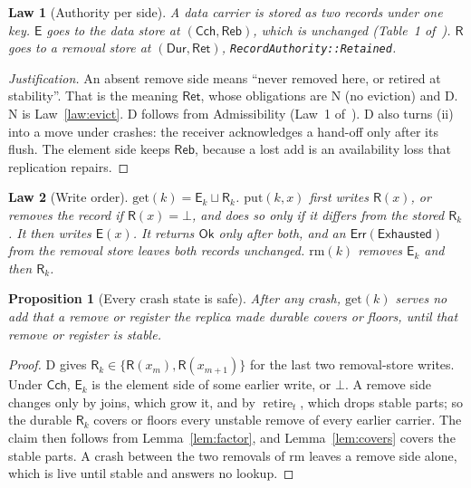 \documentclass[journal]{IEEEtran}
\newtheorem{law}{Law}
\newtheorem{proposition}{Proposition}
\newcommand{\Cached}{\mathsf{Cch}}
\newcommand{\Durable}{\mathsf{Dur}}
\newcommand{\Rebuild}{\mathsf{Reb}}
\newcommand{\Retained}{\mathsf{Ret}}
\newcommand{\Ok}{\mathsf{Ok}}
\newcommand{\Err}{\mathsf{Err}}
\newcommand{\Exhausted}{\mathsf{Exhausted}}
\newcommand{\El}{\mathsf{E}}
\newcommand{\Rm}{\mathsf{R}}
\newcommand{\ret}{\operatorname{retire}}
\begin{document}
\begin{law}[Authority per side]\label{law:authority}
A data carrier is stored as two records under one key.  $\El$ goes to the data store at
$(\Cached,\Rebuild)$, which is unchanged (Table~1 of~\cite{DurableRecords}).  $\Rm$ goes to a
\emph{removal store} at $(\Durable,\Retained)$, \texttt{RecordAuthority::Retained}.
\end{law}

\begin{proof}[Justification]
An absent remove side means ``never removed here, or retired at stability''.  That is the
meaning $\Retained$, whose obligations are N (no eviction) and D.  N is
Law~\ref{law:evict}.  D follows from Admissibility (Law~1 of~\cite{DurableRecords}).  D also
turns (ii) into a move under crashes: the receiver acknowledges a hand-off only after its
flush.  The element side keeps $\Rebuild$, because a lost add is an availability loss that
replication repairs.
\end{proof}

\begin{law}[Write order]\label{law:order}
$\mathrm{get}(k)=\El_k\sqcup\Rm_k$.  $\mathrm{put}(k,x)$ first writes $\Rm(x)$, or removes
the record if $\Rm(x)=\bot$, and does so only if it differs from the stored $\Rm_k$.  It then
writes $\El(x)$.  It returns $\Ok$ only after both, and an $\Err(\Exhausted)$ from the
removal store leaves both records unchanged.  $\mathrm{rm}(k)$ removes $\El_k$ and then
$\Rm_k$.
\end{law}

\begin{proposition}[Every crash state is safe]\label{prop:crash}
After any crash, $\mathrm{get}(k)$ serves no add that a remove or register the replica made
durable covers or floors, until that remove or register is stable.
\end{proposition}
\begin{proof}
D gives $\Rm_k\in\{\Rm(x_m),\Rm(x_{m+1})\}$ for the last two removal-store writes.  Under
$\Cached$, $\El_k$ is the element side of some earlier write, or $\bot$.  A remove side
changes only by joins, which grow it, and by $\ret_t$, which drops stable parts; so the
durable $\Rm_k$ covers or floors every unstable remove of every earlier carrier.  The claim
then follows from Lemma~\ref{lem:factor}, and Lemma~\ref{lem:covers} covers the stable parts.
A crash between the two removals of $\mathrm{rm}$ leaves a remove side alone, which is live
until stable and answers no lookup.
\end{proof}
\end{document}
